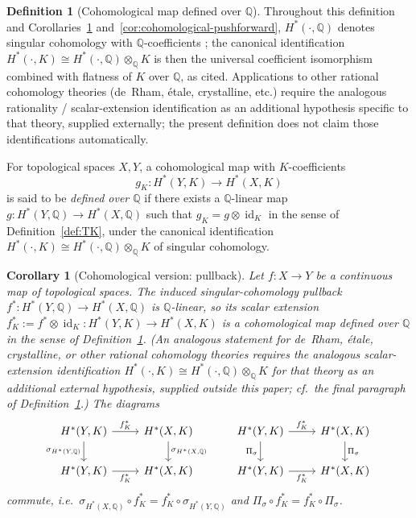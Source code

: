 \documentclass[11pt, a4paper]{amsart}
\newtheorem{corollary}[theorem]{Corollary}
\theoremstyle{definition}
\newtheorem{definition}[theorem]{Definition}
\newcommand{\Q}{\mathbb{Q}}
\newcommand{\id}{\operatorname{id}}
\begin{document}
\begin{definition}[Cohomological map defined over $\Q$]
\label{def:defined-over-Q}
Throughout this definition and Corollaries~\ref{cor:cohomological}
and~\ref{cor:cohomological-pushforward}, $H^*(\cdot, \Q)$ denotes
singular cohomology with $\Q$-coefficients \cite[Ch.~3]{Hatcher};
the canonical identification $H^*(\cdot, K) \cong H^*(\cdot, \Q)
\otimes_\Q K$ is then the universal coefficient isomorphism
combined with flatness of $K$ over $\Q$, as cited. Applications to
other rational cohomology theories (de~Rham, \'etale, crystalline,
etc.) require the analogous rationality / scalar-extension
identification as an additional hypothesis specific to that theory,
supplied externally; the present definition does not claim those
identifications automatically.

For topological spaces $X, Y$, a cohomological map with
$K$-coefficients
\[
  g_K \colon H^*(Y, K) \longrightarrow H^*(X, K)
\]
is said to be \emph{defined over $\Q$} if there exists a
$\Q$-linear map $g \colon H^*(Y, \Q) \to H^*(X, \Q)$ such that
$g_K = g \otimes \id_K$ in the sense of
Definition~\ref{def:TK}, under the canonical identification
$H^*(\cdot, K) \cong H^*(\cdot, \Q) \otimes_\Q K$ of singular
cohomology.
\end{definition}

\begin{corollary}[Cohomological version: pullback]
\label{cor:cohomological}
Let $f \colon X \to Y$ be a continuous map of topological spaces.
The induced singular-cohomology pullback
$f^* \colon H^*(Y, \Q) \to H^*(X, \Q)$ is $\Q$-linear, so its
scalar extension $f^*_K := f^* \otimes \id_K \colon H^*(Y, K) \to
H^*(X, K)$ is a cohomological map defined over $\Q$ in the sense
of Definition~\ref{def:defined-over-Q}. (An analogous statement
for de~Rham, \'etale, crystalline, or other rational cohomology
theories requires the analogous scalar-extension identification
$H^*(\cdot, K) \cong H^*(\cdot, \Q) \otimes_\Q K$ for that theory
as an additional external hypothesis, supplied outside this paper;
cf.\ the final paragraph of Definition~\ref{def:defined-over-Q}.)
The diagrams
\[
\begin{tikzcd}
  H^*(Y, K) \arrow[r, "f^*_K"] \arrow[d, "\sigma_{H^*(Y, \Q)}"'] & H^*(X, K) \arrow[d, "\sigma_{H^*(X, \Q)}"] \\
  H^*(Y, K) \arrow[r, "f^*_K"'] & H^*(X, K)
\end{tikzcd}
\qquad
\begin{tikzcd}
  H^*(Y, K) \arrow[r, "f^*_K"] \arrow[d, "\Pi_\sigma"'] & H^*(X, K) \arrow[d, "\Pi_\sigma"] \\
  H^*(Y, K) \arrow[r, "f^*_K"'] & H^*(X, K)
\end{tikzcd}
\]
commute, i.e.\
$\sigma_{H^*(X, \Q)} \circ f^*_K = f^*_K \circ \sigma_{H^*(Y, \Q)}$
and $\Pi_\sigma \circ f^*_K = f^*_K \circ \Pi_\sigma$.
\end{corollary}
\end{document}
